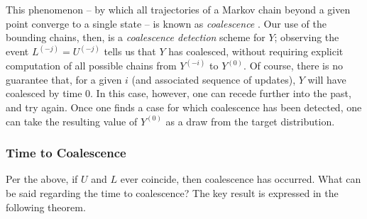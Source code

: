 \documentclass[11pt]{article}
\begin{document}
This phenomenon -- by which all trajectories of a Markov chain beyond a given point converge to a single state -- is known as \emph{coalescence} \citep{propp.wilson:rsa:1996}.  Our use of the bounding chains, then, is a \emph{coalescence detection} scheme for $Y$; observing the event $L^{(-j)}=U^{(-j)}$ tells us that $Y$ has coalesced, without requiring explicit computation of all possible chains from $Y^{(-i)}$ to $Y^{(0)}$.  Of course, there is no guarantee that, for a given $i$ (and associated sequence of updates), $Y$ will have coalesced by time 0.  In this case, however, one can recede further into the past, and try again.  Once one finds a case for which coalescence has been detected, one can take the resulting value of $Y^{(0)}$ as a draw from the target distribution.

\subsubsection{Time to Coalescence}

Per the above, if $U$ and $L$ ever coincide, then coalescence has occurred.  What can be said regarding the time to coalescence?  The key result is expressed in the following theorem.
\end{document}
